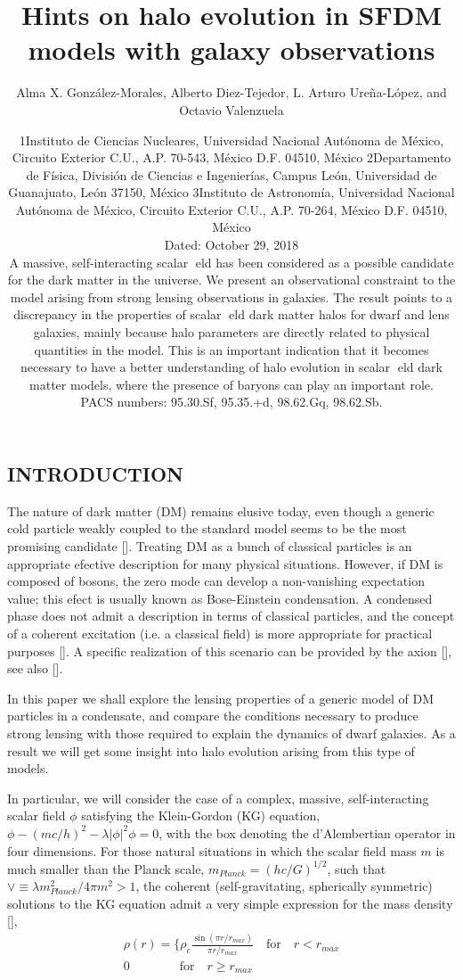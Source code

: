 \documentclass{article}
\title{\huge \textbf{Hints on halo evolution in SFDM models with galaxy observations}}
\author{Alma X. González-Morales, Alberto Diez-Tejedor, L. Arturo Ureña-López, and Octavio Valenzuela}
\date{1Instituto de Ciencias Nucleares, Universidad Nacional Autónoma de México,
Circuito Exterior C.U., A.P. 70-543, México D.F. 04510, México
2Departamento de Física, División de Ciencias e Ingenierías,
Campus León, Universidad de Guanajuato, León 37150, México
3Instituto de Astronomía, Universidad Nacional Autónoma de México,
Circuito Exterior C.U., A.P. 70-264, México D.F. 04510, México\\
Dated: October 29, 2018\\ A massive, self-interacting scalar eld has been considered as a possible candidate for the dark
matter in the universe. We present an observational constraint to the model arising from strong
lensing observations in galaxies. The result points to a discrepancy in the properties of scalar eld
dark matter halos for dwarf and lens galaxies, mainly because halo parameters are directly related
to physical quantities in the model. This is an important indication that it becomes necessary to
have a better understanding of halo evolution in scalar eld dark matter models, where the presence
of baryons can play an important role.\\
PACS numbers: 95.30.Sf, 95.35.+d, 98.62.Gq, 98.62.Sb.}
\begin{document}
\maketitle
\begin{multicols}{2}

\section{INTRODUCTION}
The nature of dark matter (DM) remains elusive today,
even though a generic cold particle weakly coupled to the
standard model seems to be the most promising candidate
[\cite{1}]. Treating DM as a bunch of classical particles is
an appropriate efective description for many physical situations.
However, if DM is composed of bosons, the zero
mode can develop a non-vanishing expectation value; this
efect is usually known as Bose-Einstein condensation. A
condensed phase does not admit a description in terms
of classical particles, and the concept of a coherent excitation
(i.e. a classical field) is more appropriate for practical
purposes [\cite{2}]. A specific realization of this scenario
can be provided by the axion [\cite{3}], see also [\cite{4}].\par
In this paper we shall explore the lensing properties
of a generic model of DM particles in a condensate, and
compare the conditions necessary to produce strong lensing
with those required to explain the dynamics of dwarf
galaxies. As a result we will get some insight into halo
evolution arising from this type of models.\par
In particular, we will consider the case of a complex,
massive, self-interacting scalar field \(\phi\) satisfying
the Klein-Gordon (KG) equation, \(\phi- (mc/h)^2-\lambda|\phi|^2\phi=0\), with the box denoting the d'Alembertian
operator in four dimensions. For those natural situations
in which the scalar field mass $m$ is much smaller
than the Planck scale, $m_{Planck}=(hc/G)^{1/2}$, such that
$\vee \equiv \lambda m^2_{Planck}/4\pi m^2 >1$, the coherent (self-gravitating,
spherically symmetric) solutions to the KG equation admit
a very simple expression for the mass density [\cite{5, 6}],
\begin{equation} \label{eq:1}
\begin{split}
\rho(r)=\Bigg\{ \rho_c\frac{\sin(\pi r/r_{max})}{\pi r/r_{max}}\quad \textrm{for} \quad r<r_{max}\\
0 \quad  \quad \quad \quad \textrm{for} \quad                                                          r\geq r_{max}

\end{split}
\end{equation}
\end{multicols}
\end{document}
